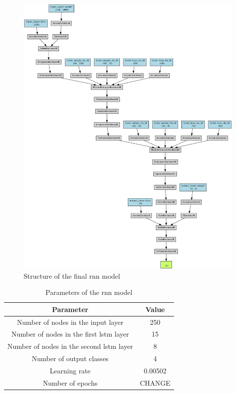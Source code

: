 \begin{figure}[h]
    \centering
    \includegraphics[scale=0.25]{images/rnn_struct.png}
    \caption{Structure of the final \acrshort{rnn} model}
    \label{fig:rnn_struct}
\end{figure}

\begin{table}[h]
    \centering
    \begin{tabular}{|c|c|}
    \hline
    \textbf{Parameter} & \textbf{Value} \\ \hline
    Number of nodes in the input layer & 250 \\ \hline
    Number of nodes in the first \acrshort{lstm} layer & 15 \\ \hline
    Number of nodes in the second \acrshort{lstm} layer & 8 \\ \hline
    Number of output classes & 4 \\ \hline
    Learning rate & 0.00502 \\ \hline
    Number of epochs & CHANGE \\ \hline
    \end{tabular}
    \caption{Parameters of the \acrshort{rnn} model}
    \label{table:rnn_params}
\end{table}

